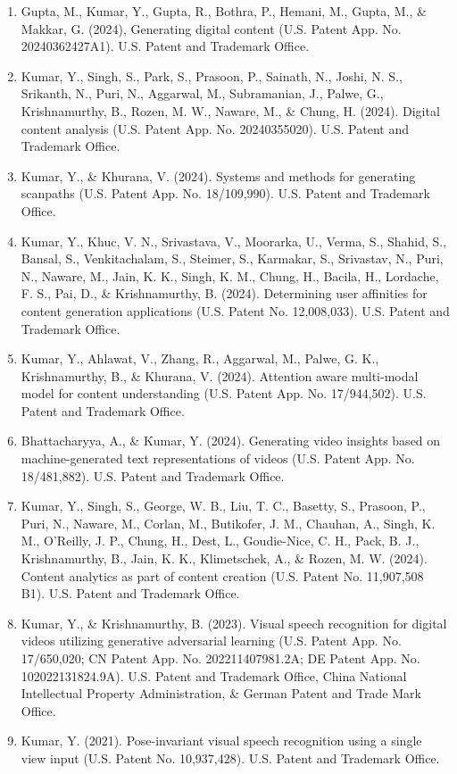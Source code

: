 \begin{enumerate}
    \item Gupta, M., Kumar, Y., Gupta, R., Bothra, P., Hemani, M., Gupta, M., \& Makkar, G. (2024), Generating digital content (U.S. Patent App. No. 20240362427A1). U.S. Patent and Trademark Office.

    \item Kumar, Y., Singh, S., Park, S., Prasoon, P., Sainath, N., Joshi, N. S., Srikanth, N., Puri, N., Aggarwal, M., Subramanian, J., Palwe, G., Krishnamurthy, B., Rozen, M. W., Naware, M., \& Chung, H. (2024). Digital content analysis (U.S. Patent App. No. 20240355020). U.S. Patent and Trademark Office.

    \item Kumar, Y., \& Khurana, V. (2024). Systems and methods for generating scanpaths (U.S. Patent App. No. 18/109,990). U.S. Patent and Trademark Office.

    \item Kumar, Y., Khuc, V. N., Srivastava, V., Moorarka, U., Verma, S., Shahid, S., Bansal, S., Venkitachalam, S., Steimer, S., Karmakar, S., Srivastav, N., Puri, N., Naware, M., Jain, K. K., Singh, K. M., Chung, H., Bacila, H., Lordache, F. S., Pai, D., \& Krishnamurthy, B. (2024). Determining user affinities for content generation applications (U.S. Patent No. 12,008,033). U.S. Patent and Trademark Office.

    \item Kumar, Y., Ahlawat, V., Zhang, R., Aggarwal, M., Palwe, G. K., Krishnamurthy, B., \& Khurana, V. (2024). Attention aware multi-modal model for content understanding (U.S. Patent App. No. 17/944,502). U.S. Patent and Trademark Office.

    \item Bhattacharyya, A., \& Kumar, Y. (2024). Generating video insights based on machine-generated text representations of videos (U.S. Patent App. No. 18/481,882). U.S. Patent and Trademark Office.
    
    \item Kumar, Y., Singh, S., George, W. B., Liu, T. C., Basetty, S., Prasoon, P., Puri, N., Naware, M., Corlan, M., Butikofer, J. M., Chauhan, A., Singh, K. M., O'Reilly, J. P., Chung, H., Dest, L., Goudie-Nice, C. H., Pack, B. J., Krishnamurthy, B., Jain, K. K., Klimetschek, A., \& Rozen, M. W. (2024). Content analytics as part of content creation (U.S. Patent No. 11,907,508 B1). U.S. Patent and Trademark Office.
    
    \item Kumar, Y., \& Krishnamurthy, B. (2023). Visual speech recognition for digital videos utilizing generative adversarial learning (U.S. Patent App. No. 17/650,020; CN Patent App. No. 202211407981.2A; DE Patent App. No. 102022131824.9A). U.S. Patent and Trademark Office, China National Intellectual Property Administration, \& German Patent and Trade Mark Office.

    \item Kumar, Y. (2021). Pose-invariant visual speech recognition using a single view input (U.S. Patent No. 10,937,428). U.S. Patent and Trademark Office.

\end{enumerate}


